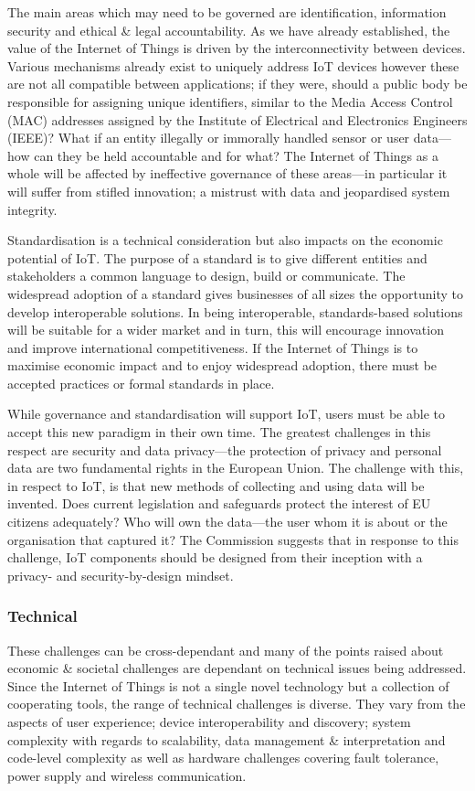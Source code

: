        The main areas which may need to be governed are identification, information security and ethical \& legal accountability. As we have already established, the value of the Internet of Things is driven by the interconnectivity between devices. Various mechanisms already exist to uniquely address IoT devices however these are not all compatible between applications; if they were, should a public body be responsible for assigning unique identifiers, similar to the Media Access Control (MAC) addresses assigned by the Institute of Electrical and Electronics Engineers (IEEE)? What if an entity illegally or immorally handled sensor or user data---how can they be held accountable and for what? The Internet of Things as a whole will be affected by ineffective governance of these areas---in particular it will suffer from stifled innovation; a mistrust with data and jeopardised system integrity. %

        Standardisation is a technical consideration but also impacts on the economic potential of IoT. The purpose of a standard is to give different entities and stakeholders a common language to design, build or communicate. The widespread adoption of a standard gives businesses of all sizes the opportunity to develop interoperable solutions. In being interoperable, standards-based solutions will be suitable for a wider market and in turn, this will encourage innovation and improve international competitiveness. If the Internet of Things is to maximise economic impact and to enjoy widespread adoption, there must be accepted practices or formal standards in place.

        While governance and standardisation will support IoT, users must be able to accept this new paradigm in their own time. The greatest challenges in this respect are security and data privacy---the protection of privacy and personal data are two fundamental rights in the European Union. The challenge with this, in respect to IoT, is that new methods of collecting and using data will be invented. Does current legislation and safeguards protect the interest of EU citizens adequately? Who will own the data---the user whom it is about or the organisation that captured it? The Commission suggests that in response to this challenge, IoT components should be designed from their inception with a privacy- and security-by-design mindset.

      \subsubsection{Technical}
        These challenges can be cross-dependant and many of the points raised about economic \& societal challenges are dependant on technical issues being addressed. Since the Internet of Things is not a single novel technology but a collection of cooperating tools, the range of technical challenges is diverse. They vary from the aspects of user experience; device interoperability and discovery; system complexity with regards to scalability, data management \& interpretation and code-level complexity as well as hardware challenges covering fault tolerance, power supply and wireless communication.

